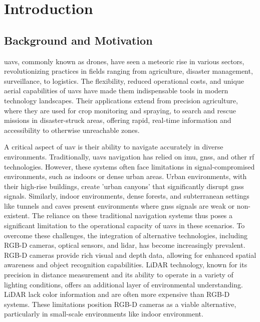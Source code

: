 \chapter{Introduction}

\section{Background and Motivation}

\acrfull{uavs}, commonly known as drones, have seen a meteoric rise in various sectors, revolutionizing practices in fields ranging from agriculture\cite{agri_review}, disaster management\cite{disaster_review}, surveillance\cite{surveillance}, to logistics\cite{logistics}. The flexibility, reduced operational costs, and unique aerial capabilities of \acrshort{uavs} have made them indispensable tools in modern technology landscapes. Their applications extend from precision agriculture, where they are used for crop monitoring and spraying, to search and rescue missions in disaster-struck areas, offering rapid, real-time information and accessibility to otherwise unreachable zones\cite{agri_review,disaster_review}.

A critical aspect of \acrshort{uav} is their ability to navigate accurately in diverse environments. Traditionally, \acrshort{uavs} navigation has relied on \acrfull{imu}, \acrfull{gnss}\cite{gps_fusion}, and other \acrfull{rf}\cite{rf1,gnss_denied_uwb_indoor} technologies. However, these systems often face limitations in signal-compromised environments, such as indoors or dense urban areas. Urban environments, with their high-rise buildings, create 'urban canyons' that significantly disrupt \acrshort{gnss} signals. Similarly, indoor environments, dense forests, and subterranean settings like tunnels and caves present environments where \acrshort{gnss} signals are weak or non-existent. The reliance on these traditional navigation systems thus poses a significant limitation to the operational capacity of \acrshort{uavs} in these scenarios. To overcome these challenges, the integration of alternative technologies, including RGB-D cameras, optical sensors, and \acrfull{lidar}, has become increasingly prevalent\cite{gnss_denied_review,gps_denied_review}. RGB-D cameras provide rich visual and depth data, allowing for enhanced spatial awareness and object recognition capabilities. LiDAR technology, known for its precision in distance measurement and its ability to operate in a variety of lighting conditions, offers an additional layer of environmental understanding\cite{segmap}. LiDAR lack color information and are often more expensive than RGB-D systems. These limitations position RGB-D cameras as a viable alternative, particularly in small-scale environments like indoor environment\cite{rgbd_indoor}. 

